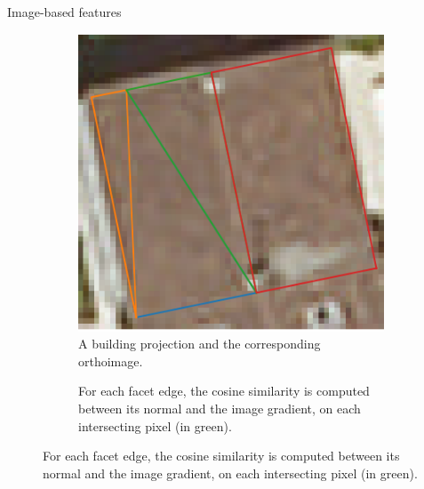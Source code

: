 \documentclass[export]{beamer}
\begin{document}
        \begin{frame}{Image-based features}
            \begin{figure}
                \begin{subfigure}{.48\textwidth}
                    \includegraphics[width=\textwidth]{images/radio_vector}
                    \caption{\label{fig::ortho_sup} A building projection and the corresponding orthoimage.}
                \end{subfigure}
                \begin{subfigure}{.48\textwidth}
                    
                    \caption{\label{fig::hist} For each facet edge, the cosine similarity is computed between its normal and the image gradient, on each intersecting pixel (in green).}
                \end{subfigure}
            \end{figure}
        \end{frame}
\end{document}
